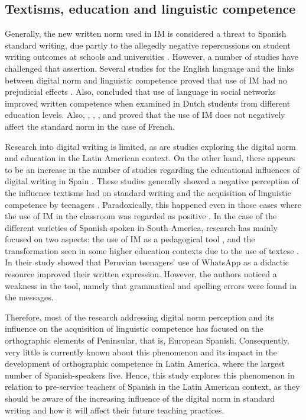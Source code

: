 \documentclass[english]{textolivre}
\begin{document}
\subsection{Textisms, education and linguistic competence}
Generally, the new written norm used in IM is considered a threat to Spanish standard writing, due partly to the allegedly negative repercussions on student writing outcomes at schools and universities \cite{DeJonge2012, Drouin2014, Johnson2015, Thurlow2013}. However, a number of studies have challenged that assertion. Several studies for the English language and the links between digital norm and linguistic competence proved that use of IM had no prejudicial effects \cite{Bushnell2011, Drouin2011, Gann2010, Kemp2011, Plester2009, Powell2011, Wood2014}. Also, \textcite{Verheijen2020} concluded that use of language in social networks improved written competence when examined in Dutch students from different education levels. Also, \textcite{Bouillaud2007}, \textcite{Bernicot2014}, \textcite{Lanchantin2014}, and \textcite{Cougnon2017} proved that the use of IM does not negatively affect the standard norm in the case of French. 

Research into digital writing is limited, as are studies exploring the digital norm and education in the Latin American context. On the other hand, there appears to be an increase in the number of studies regarding the educational influences of digital writing in Spain \cite{Cremades2019b, Llopis-Susierra2020}. These studies generally showed a negative perception of the influence textisms had on standard writing and the acquisition of linguistic competence by teenagers \cite{Gomez-Camacho2018, Hunt-Gomez2020}. Paradoxically, this happened even in those cases where the use of IM in the classroom was regarded as positive \cite{Cremades2019b, Llopis-Susierra2020}. In the case of the different varieties of Spanish spoken in South America, research has mainly focused on two aspects: the use of IM as a pedagogical tool \cite{Escobar-Mamani2020,Gonzalez-Same2019}, and the transformation seen in some higher education contexts due to the use of textese \cite{Veytia-Bucheli2020}. In their study \textcite{Escobar-Mamani2020} showed that Peruvian teenagers’ use of WhatsApp as a didactic resource improved their written expression. However, the authors noticed a weakness in the tool, namely that grammatical and spelling errors were found in the messages.

Therefore, most of the research addressing digital norm perception and its influence on the acquisition of linguistic competence has focused on the orthographic elements of Peninsular, that is, European Spanish. Consequently, very little is currently known about this phenomenon and its impact in the development of orthographic competence in Latin America, where the largest number of Spanish-speakers live. Hence, this study explores this phenomenon in relation to pre-service teachers of Spanish in the Latin American context, as they should be aware of the increasing influence of the digital norm in standard writing and how it will affect their future teaching practices. 
\end{document}
